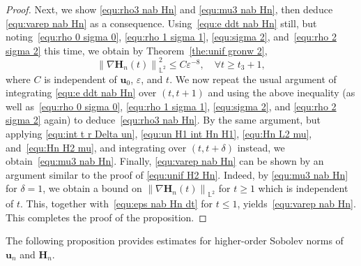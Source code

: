 \documentclass[11pt, reqno]{amsart}
\theoremstyle{definition}
\numberwithin{equation}{section}
\newcommand{\bff}{\boldsymbol}
\newcommand{\bb}{\mathbb}
\newcommand{\norm}[2]{\left\|{#1}\right\|_{#2}}
\begin{document}
\begin{proof}
Next, we show \eqref{equ:rho3 nab Hn} and \eqref{equ:mu3 nab Hn}, then deduce \eqref{equ:varep nab Hn} as a consequence. Using~\eqref{equ:e ddt nab Hn} still, but noting~\eqref{equ:rho 0 sigma 0}, \eqref{equ:rho 1 sigma 1}, \eqref{equ:sigma 2}, and~\eqref{equ:rho 2 sigma 2} this time, we obtain by Theorem~\ref{the:unif gronw 2},
\[
    \norm{\nabla \bff{H}_n(t)}{\bb{L}^2}^2 \leq C\varepsilon^{-8}, \quad \forall t\geq t_3+1,
\]
where $C$ is independent of $\bff{u}_0$, $\varepsilon$, and $t$. We now repeat the usual argument of integrating \eqref{equ:e ddt nab Hn} over $(t,t+1)$ and using the above inequality (as well as~\eqref{equ:rho 0 sigma 0}, \eqref{equ:rho 1 sigma 1}, \eqref{equ:sigma 2}, and \eqref{equ:rho 2 sigma 2} again) to deduce~\eqref{equ:rho3 nab Hn}.
By the same argument, but applying \eqref{equ:int t r Delta un}, \eqref{equ:un H1 int Hn H1}, \eqref{equ:Hn L2 mu}, and~\eqref{equ:Hn H2 mu}, and integrating over $(t,t+\delta)$ instead, we obtain~\eqref{equ:mu3 nab Hn}. 
Finally, \eqref{equ:varep nab Hn} can be shown by an argument similar to the proof of \eqref{equ:unif H2 Hn}. Indeed, by \eqref{equ:mu3 nab Hn} for $\delta=1$, we obtain a bound on $\norm{\nabla \bff{H}_n(t)}{\bb{L}^2}$ for $t\geq 1$ which is independent of $t$. This, together with~\eqref{equ:eps nab Hn dt} for $t\leq 1$, yields~\eqref{equ:varep nab Hn}.
This completes the proof of the proposition.
\end{proof}

The following proposition provides estimates for higher-order Sobolev norms of $\bff{u}_n$ and $\bff{H}_n$.
\end{document}

